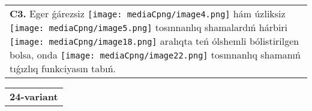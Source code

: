 \documentclass{article}
\begin{document}
\begin{tabular}{m{17cm}}
 \\
\textbf{C3.} Eger ǵárezsiz \texttt{[image: mediaCpng/image4.png]} hám úzliksiz \texttt{[image: mediaCpng/image5.png]} tosınnanlıq shamalardıń hárbiri \texttt{[image: mediaCpng/image18.png]} aralıqta teń ólshemli bólistirilgen bolsa, onda \texttt{[image: mediaCpng/image22.png]} tosınnanlıq shamanıń tıǵızlıq funkciyasın tabıń.
 \\

\end{tabular}
\vspace{1cm}


\begin{tabular}{m{17cm}}
\textbf{24-variant}
\newline


\end{tabular}
\end{document}
